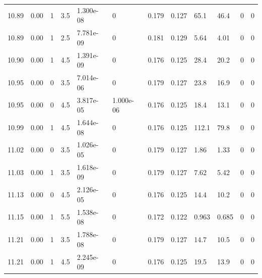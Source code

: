 \documentclass[preview]{standalone}
\begin{document}
{{{{{{{{{{\begin{tabular}{L{1.2cm}C{1.2cm} C{0.3cm}C{0.5cm} C{1.4cm}C{1.4cm} C{1.4cm}C{1.4cm} C{1.6cm}C{1.6cm} C{1.6cm}C{1.6cm}}
  10.89  &  0.00  & 1     & 3.5 &  1.300e-08  & 0  &  0.179&   0.127& 65.1 & 46.4   &  0 & 0  \\ 
  10.89  &  0.00  & 1     & 2.5 &  7.781e-09  & 0  &  0.181&   0.129& 5.64 & 4.01   &  0 & 0  \\ 
  10.90  &  0.00  & 1     & 4.5 &  1.391e-09  & 0  &  0.176&   0.125& 28.4 & 20.2   &  0 & 0  \\ 
  10.95  &  0.00  & 0     & 3.5 &  7.014e-06  & 0  &  0.179&   0.127& 23.8 & 16.9   &  0 & 0  \\ 
  10.95  &  0.00  & 0     & 4.5 &  3.817e-05  & 1.000e-06  &  0.176&   0.125& 18.4 & 13.1   &  0 & 0  \\ 
  10.99  &  0.00  & 1     & 4.5 &  1.644e-08  & 0  &  0.176&   0.125& 112.1 & 79.8   &  0 & 0  \\ 
  11.02  &  0.00  & 0     & 3.5 &  1.026e-05  & 0  &  0.179&   0.127& 1.86 & 1.33   &  0 & 0  \\ 
  11.03  &  0.00  & 1     & 3.5 &  1.618e-09  & 0  &  0.179&   0.127& 7.62 & 5.42   &  0 & 0  \\ 
  11.13  &  0.00  & 0     & 4.5 &  2.126e-05  & 0  &  0.176&   0.125& 14.4 & 10.2   &  0 & 0  \\ 
  11.15  &  0.00  & 1     & 5.5 &  1.538e-08  & 0  &  0.172&   0.122& 0.963 & 0.685   &  0 & 0  \\ 
  11.21  &  0.00  & 1     & 3.5 &  1.788e-08  & 0  &  0.179&   0.127& 14.7 & 10.5   &  0 & 0  \\ 
  11.21  &  0.00  & 1     & 4.5 &  2.245e-09  & 0  &  0.176&   0.125& 19.5 & 13.9   &  0 & 0  \\ 
\hline 
\end{tabular} 

}}}}}}}}}}
\end{document}
